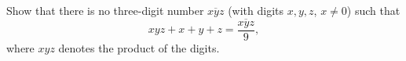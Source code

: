 Show that there is no three-digit number $\overline{xyz}$ (with digits $x,y,z$, $x\ne0$) such that
\[xyz+x+y+z=\dfrac{\overline{xyz}}{9},\]
where $xyz$ denotes the product of the digits.
